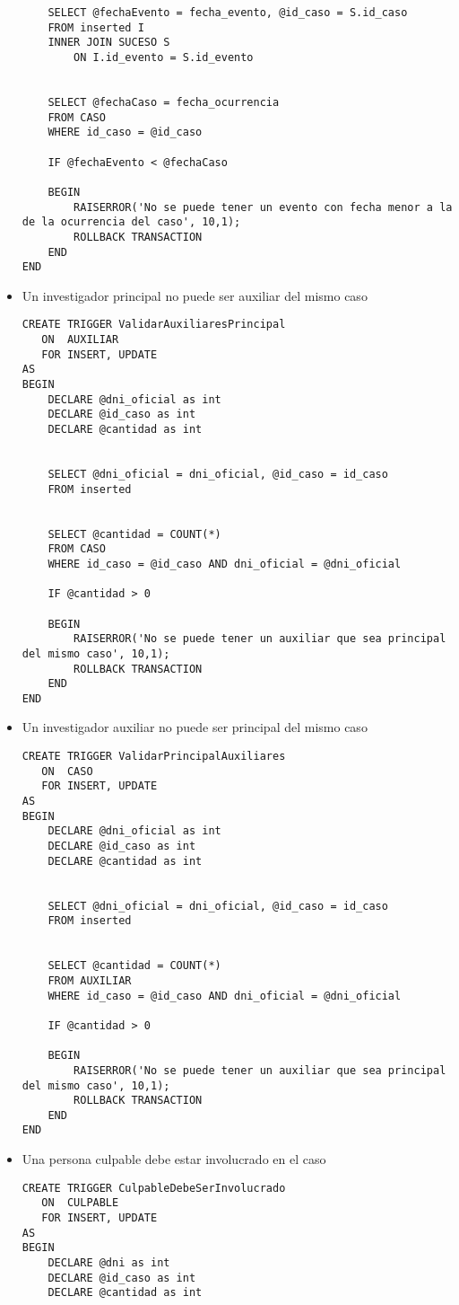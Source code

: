 \begin{itemize}
\begin{lstlisting}
    SELECT @fechaEvento = fecha_evento, @id_caso = S.id_caso
	FROM inserted I
	INNER JOIN SUCESO S
		ON I.id_evento = S.id_evento


	SELECT @fechaCaso = fecha_ocurrencia
	FROM CASO
	WHERE id_caso = @id_caso

	IF @fechaEvento < @fechaCaso

	BEGIN
		RAISERROR('No se puede tener un evento con fecha menor a la de la ocurrencia del caso', 10,1);
		ROLLBACK TRANSACTION
	END
END
\end{lstlisting}

\item Un investigador principal no puede ser auxiliar del mismo caso\\
\begin{lstlisting}
CREATE TRIGGER ValidarAuxiliaresPrincipal
   ON  AUXILIAR
   FOR INSERT, UPDATE
AS 
BEGIN
	DECLARE @dni_oficial as int
	DECLARE @id_caso as int	
	DECLARE @cantidad as int
	

    SELECT @dni_oficial = dni_oficial, @id_caso = id_caso
	FROM inserted


	SELECT @cantidad = COUNT(*) 
	FROM CASO
	WHERE id_caso = @id_caso AND dni_oficial = @dni_oficial

	IF @cantidad > 0

	BEGIN
		RAISERROR('No se puede tener un auxiliar que sea principal del mismo caso', 10,1);
		ROLLBACK TRANSACTION
	END
END
\end{lstlisting}

\item Un investigador auxiliar no puede ser principal del mismo caso\\
\begin{lstlisting}
CREATE TRIGGER ValidarPrincipalAuxiliares
   ON  CASO
   FOR INSERT, UPDATE
AS 
BEGIN
	DECLARE @dni_oficial as int
	DECLARE @id_caso as int	
	DECLARE @cantidad as int
	

    SELECT @dni_oficial = dni_oficial, @id_caso = id_caso
	FROM inserted


	SELECT @cantidad = COUNT(*) 
	FROM AUXILIAR
	WHERE id_caso = @id_caso AND dni_oficial = @dni_oficial

	IF @cantidad > 0

	BEGIN
		RAISERROR('No se puede tener un auxiliar que sea principal del mismo caso', 10,1);
		ROLLBACK TRANSACTION
	END
END
\end{lstlisting}

\item Una persona culpable debe estar involucrado en el caso\\
\begin{lstlisting}
CREATE TRIGGER CulpableDebeSerInvolucrado
   ON  CULPABLE
   FOR INSERT, UPDATE
AS 
BEGIN
	DECLARE @dni as int
	DECLARE @id_caso as int	
	DECLARE @cantidad as int
	


\end{lstlisting}
\end{itemize}
